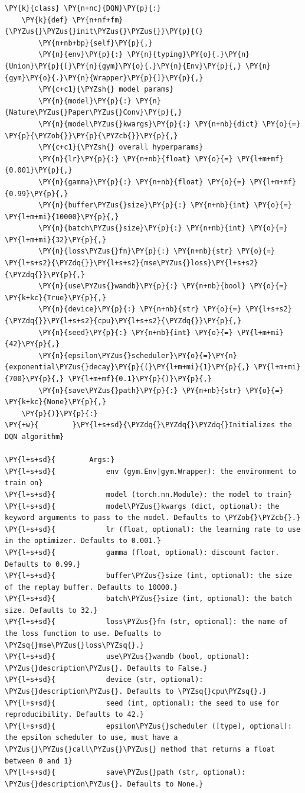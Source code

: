 \documentclass{article}
\begin{document}
\begin{Verbatim}[commandchars=\\\{\}]
\PY{k}{class} \PY{n+nc}{DQN}\PY{p}{:}
    \PY{k}{def} \PY{n+nf+fm}{\PYZus{}\PYZus{}init\PYZus{}\PYZus{}}\PY{p}{(}
        \PY{n+nb+bp}{self}\PY{p}{,}
        \PY{n}{env}\PY{p}{:} \PY{n}{typing}\PY{o}{.}\PY{n}{Union}\PY{p}{[}\PY{n}{gym}\PY{o}{.}\PY{n}{Env}\PY{p}{,} \PY{n}{gym}\PY{o}{.}\PY{n}{Wrapper}\PY{p}{]}\PY{p}{,}
        \PY{c+c1}{\PYZsh{} model params}
        \PY{n}{model}\PY{p}{:} \PY{n}{Nature\PYZus{}Paper\PYZus{}Conv}\PY{p}{,}
        \PY{n}{model\PYZus{}kwargs}\PY{p}{:} \PY{n+nb}{dict} \PY{o}{=} \PY{p}{\PYZob{}}\PY{p}{\PYZcb{}}\PY{p}{,}
        \PY{c+c1}{\PYZsh{} overall hyperparams}
        \PY{n}{lr}\PY{p}{:} \PY{n+nb}{float} \PY{o}{=} \PY{l+m+mf}{0.001}\PY{p}{,}
        \PY{n}{gamma}\PY{p}{:} \PY{n+nb}{float} \PY{o}{=} \PY{l+m+mf}{0.99}\PY{p}{,}
        \PY{n}{buffer\PYZus{}size}\PY{p}{:} \PY{n+nb}{int} \PY{o}{=} \PY{l+m+mi}{10000}\PY{p}{,}
        \PY{n}{batch\PYZus{}size}\PY{p}{:} \PY{n+nb}{int} \PY{o}{=} \PY{l+m+mi}{32}\PY{p}{,}
        \PY{n}{loss\PYZus{}fn}\PY{p}{:} \PY{n+nb}{str} \PY{o}{=} \PY{l+s+s2}{\PYZdq{}}\PY{l+s+s2}{mse\PYZus{}loss}\PY{l+s+s2}{\PYZdq{}}\PY{p}{,}
        \PY{n}{use\PYZus{}wandb}\PY{p}{:} \PY{n+nb}{bool} \PY{o}{=} \PY{k+kc}{True}\PY{p}{,}
        \PY{n}{device}\PY{p}{:} \PY{n+nb}{str} \PY{o}{=} \PY{l+s+s2}{\PYZdq{}}\PY{l+s+s2}{cpu}\PY{l+s+s2}{\PYZdq{}}\PY{p}{,}
        \PY{n}{seed}\PY{p}{:} \PY{n+nb}{int} \PY{o}{=} \PY{l+m+mi}{42}\PY{p}{,}
        \PY{n}{epsilon\PYZus{}scheduler}\PY{o}{=}\PY{n}{exponential\PYZus{}decay}\PY{p}{(}\PY{l+m+mi}{1}\PY{p}{,} \PY{l+m+mi}{700}\PY{p}{,} \PY{l+m+mf}{0.1}\PY{p}{)}\PY{p}{,}
        \PY{n}{save\PYZus{}path}\PY{p}{:} \PY{n+nb}{str} \PY{o}{=} \PY{k+kc}{None}\PY{p}{,}
    \PY{p}{)}\PY{p}{:}
\PY{+w}{        }\PY{l+s+sd}{\PYZdq{}\PYZdq{}\PYZdq{}Initializes the DQN algorithm}

\PY{l+s+sd}{        Args:}
\PY{l+s+sd}{            env (gym.Env|gym.Wrapper): the environment to train on}
\PY{l+s+sd}{            model (torch.nn.Module): the model to train}
\PY{l+s+sd}{            model\PYZus{}kwargs (dict, optional): the keyword arguments to pass to the model. Defaults to \PYZob{}\PYZcb{}.}
\PY{l+s+sd}{            lr (float, optional): the learning rate to use in the optimizer. Defaults to 0.001.}
\PY{l+s+sd}{            gamma (float, optional): discount factor. Defaults to 0.99.}
\PY{l+s+sd}{            buffer\PYZus{}size (int, optional): the size of the replay buffer. Defaults to 10000.}
\PY{l+s+sd}{            batch\PYZus{}size (int, optional): the batch size. Defaults to 32.}
\PY{l+s+sd}{            loss\PYZus{}fn (str, optional): the name of the loss function to use. Defualts to \PYZsq{}mse\PYZus{}loss\PYZsq{}.}
\PY{l+s+sd}{            use\PYZus{}wandb (bool, optional): \PYZus{}description\PYZus{}. Defaults to False.}
\PY{l+s+sd}{            device (str, optional): \PYZus{}description\PYZus{}. Defaults to \PYZsq{}cpu\PYZsq{}.}
\PY{l+s+sd}{            seed (int, optional): the seed to use for reproducibility. Defaults to 42.}
\PY{l+s+sd}{            epsilon\PYZus{}scheduler ([type], optional): the epsilon scheduler to use, must have a \PYZus{}\PYZus{}call\PYZus{}\PYZus{} method that returns a float between 0 and 1}
\PY{l+s+sd}{            save\PYZus{}path (str, optional): \PYZus{}description\PYZus{}. Defaults to None.}


\end{Verbatim}
\end{document}
